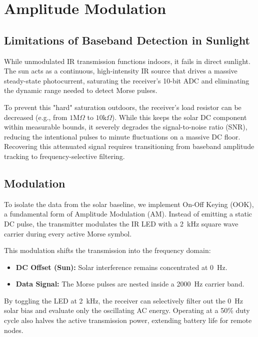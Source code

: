 \documentclass[conference]{IEEEtran}
\begin{document}
\section{Amplitude Modulation}

\subsection{Limitations of Baseband Detection in Sunlight}
While unmodulated IR transmission functions indoors, it fails in direct sunlight. The sun acts as a continuous, high-intensity IR source that drives a massive steady-state photocurrent, saturating the receiver's 10-bit ADC and eliminating the dynamic range needed to detect Morse pulses. 

To prevent this "hard" saturation outdoors, the receiver's load resistor can be decreased (e.g., from $1\text{M}\Omega$ to $10\text{k}\Omega$). While this keeps the solar DC component within measurable bounds, it severely degrades the signal-to-noise ratio (SNR), reducing the intentional pulses to minute fluctuations on a massive DC floor. Recovering this attenuated signal requires transitioning from baseband amplitude tracking to frequency-selective filtering.

\subsection{Modulation}
To isolate the data from the solar baseline, we implement On-Off Keying (OOK), a fundamental form of Amplitude Modulation (AM). Instead of emitting a static DC pulse, the transmitter modulates the IR LED with a 2~kHz square wave carrier during every active Morse symbol.

This modulation shifts the transmission into the frequency domain:
\begin{itemize}
    \item \textbf{DC Offset (Sun):} Solar interference remains concentrated at 0~Hz.
    \item \textbf{Data Signal:} The Morse pulses are nested inside a 2000~Hz carrier band.
\end{itemize}
By toggling the LED at 2~kHz, the receiver can selectively filter out the 0~Hz solar bias and evaluate only the oscillating AC energy. Operating at a 50\% duty cycle also halves the active transmission power, extending battery life for remote nodes.
\end{document}
